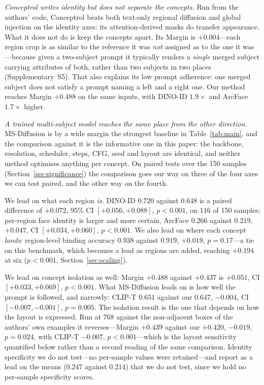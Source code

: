 \documentclass[10pt,twocolumn,letterpaper]{article}
\begin{document}
\noindent\textit{Conceptrol writes identity but does not separate the
concepts.}
Run from the authors' code, Conceptrol beats both text-only regional
diffusion and global injection on the identity axes: its attention-derived
masks do transfer appearance.  What it does not do is keep the concepts apart.
Its Margin is $+0.004$---each region crop is as similar to the reference it was
\emph{not} assigned as to the one it was---because given a two-subject prompt
it typically renders a \emph{single} merged subject carrying attributes of
both, rather than two subjects in two places (Supplementary~S5).  That also
explains its low prompt adherence: one merged subject does not satisfy a
prompt naming a left and a right one.  Our method reaches Margin $+0.488$ on
the same inputs, with DINO-ID $1.9\times$ and ArcFace $1.7\times$ higher.

\noindent\textit{A trained multi-subject model reaches the same place from
the other direction.}
MS-Diffusion is by a wide margin the strongest baseline in
Table~\ref{tab:main}, and the comparison against it is the informative one
in this paper: the backbone, resolution, scheduler, steps, CFG, seed and
layout are identical, and neither method optimises anything per concept.  On
paired tests over the 150 samples (Section~\ref{sec:significance}) the
comparison goes our way on three of the four axes we can test paired, and
the other way on the fourth.

We lead on what each region \emph{is}.  DINO-ID $0.720$ against $0.648$ is a
paired difference of $+0.072$, 95\% CI $[+0.056,+0.088]$, $p{<}0.001$, on 116
of 150 samples; per-region face identity is larger and more certain, ArcFace
$0.266$ against $0.219$, $+0.047$, CI $[+0.034,+0.060]$, $p{<}0.001$.  We
also lead on where each concept \emph{lands}: region-level binding accuracy
$0.938$ against $0.919$, $+0.019$, $p{=}0.17$---a tie on this benchmark,
which becomes a lead as regions are added, reaching $+0.194$ at six
($p{<}0.001$, Section~\ref{sec:scaling}).

We lead on concept isolation as well: Margin $+0.488$ against $+0.437$ is
$+0.051$, CI $[+0.033,+0.069]$, $p{<}0.001$.  What MS-Diffusion leads on is
how well the prompt is followed, and narrowly: CLIP-T $0.651$ against our
$0.647$, $-0.004$, CI $[-0.007,-0.001]$, $p{=}0.005$.  The isolation result
is the one that depends on how the layout is expressed.  Run at $768$ against
the non-adjacent boxes of the authors' own examples it reverses---Margin
$+0.439$ against our $+0.420$, $-0.019$, $p{=}0.024$, with CLIP-T $-0.007$,
$p{<}0.001$---which is the layout sensitivity quantified below rather than a
second reading of the same comparison.  Identity specificity we do not test---no per-sample values were
retained---and report as a lead on the means ($0.247$ against $0.214$) that
we do not test, since we hold no per-sample specificity scores.
\end{document}
